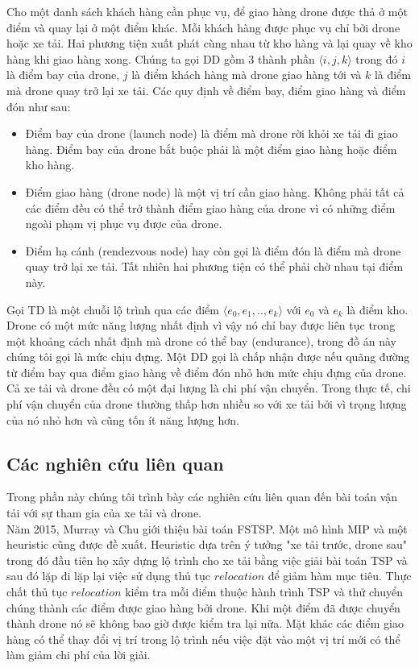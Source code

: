 \documentclass[a4paper,12pt]{report}
\begin{document}
Cho một danh sách khách hàng cần phục vụ, để giao hàng drone được thả ở một điểm và quay lại ở một điểm khác. Mỗi khách hàng được phục vụ chỉ bởi drone hoặc xe tải. Hai phương tiện xuất phát cùng nhau từ kho hàng và lại quay về kho hàng khi giao hàng xong. Chúng ta gọi \ac{DD} gồm 3 thành phần $\langle i,j,k \rangle$ trong đó $i$ là điểm bay của drone, $j$ là điểm khách hàng mà drone giao hàng tới và $k$ là điểm mà drone quay trở lại xe tải. Các quy định về điểm bay, điểm giao hàng và điểm đón như sau:
\begin{itemize}
\item Điểm bay của drone (launch node) là điểm mà drone rời khỏi xe tải đi giao hàng. Điểm bay của drone bắt buộc phải là một điểm giao hàng hoặc điểm kho hàng. 
\item Điểm giao hàng (drone node) là một vị trí cần giao hàng. Không phải tất cả các điểm đều có thể trở thành điểm giao hàng của drone vì có những điểm ngoài phạm vị phục vụ được của drone.
\item Điểm hạ cánh (rendezvous node) hay còn gọi là điểm đón là điểm mà drone quay trở lại xe tải. Tất nhiên hai phương tiện có thể phải chờ nhau tại điểm này.
\end{itemize}
Gọi  \ac{TD} là một chuỗi lộ trình qua các điểm $\langle e_0,e_1,..,e_k \rangle $ với $e_0$ và $e_k$ là điểm kho.
Drone có một mức năng lượng nhất định vì vậy nó chỉ bay được liên tục trong một khoảng cách nhất định mà drone có thể bay (endurance), trong đồ án này chúng tôi gọi là mức chịu đựng. Một \ac{DD} gọi là chấp nhận được nếu quãng đường từ điểm bay qua điểm giao hàng về điểm đón nhỏ hơn mức chịu đựng của drone. Cả xe tải và drone đều có một đại lượng là chi phí vận chuyển. Trong thực tế, chi phí vận chuyển của drone thường thấp hơn nhiều so với xe tải bởi vì trọng lượng của nó nhỏ hơn và cũng tốn ít năng lượng hơn.


\subsection{Các nghiên cứu liên quan}
Trong phần này chúng tôi trình bày các nghiên cứu liên quan đến bài toán vận tải với sự tham gia của xe tải và drone.\\

Năm 2015, Murray và Chu \cite{12} giới thiệu bài toán \ac{FSTSP}. Một mô hình \ac{MIP} và một heuristic cũng được đề xuất. Heuristic dựa trên ý tưởng "xe tải trước, drone sau" trong đó đầu tiên họ xây dựng lộ trình cho xe tải bằng việc giải bài toán \ac{TSP} và sau đó lặp đi lặp lại việc sử dụng thủ tục $relocation$ để giảm hàm mục tiêu. Thực chất thủ tục $relocation$ kiểm tra mỗi điểm thuộc hành trình TSP và thử chuyển chúng thành các điểm được giao hàng bởi drone. Khi một điểm đã được chuyển thành drone nó sẽ không bao giờ được kiểm tra lại nữa. Mặt khác các điểm giao hàng có thể thay đổi vị trí trong lộ trình nếu việc đặt vào một vị trí mới có thể làm giảm chi phí của lời giải. \\
\end{document}
